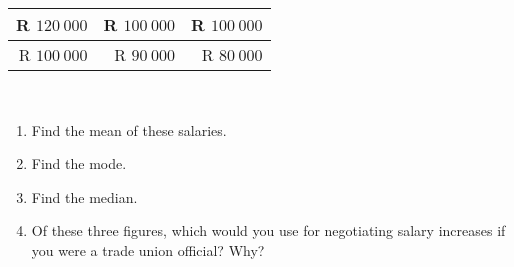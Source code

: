 \begin{eocexercises}{}
\begin{enumerate}[itemsep=6pt, label=\textbf{\arabic*}.]
\begin{center}
\begin{tabular}{|r|r|r|}
        R $120 ~000 $& R $100~ 000$ & R $100 ~000$ \\\hline
        R $100 ~000$ & R  $90~ 000$ & R  $80 ~000$ \\\hline
      \end{tabular}
    \end{center}
\vspace {8pt}\\
    \begin{enumerate}[noitemsep, label=\textbf{(\alph*)} ]
    \item Find the mean of these salaries.
    \item Find the mode.
    \item Find the median.
    \item Of these three figures, which would you use for
      negotiating salary increases if you were a trade union
      official? Why?
    \end{enumerate}
  \end{enumerate}

\end{eocexercises}


